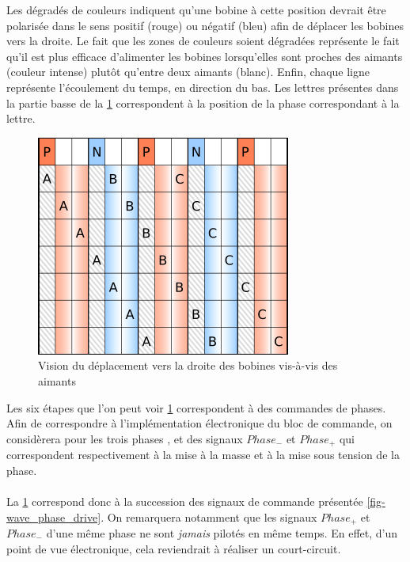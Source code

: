 Les dégradés de couleurs indiquent qu'une bobine à cette position devrait être polarisée dans le sens positif (rouge) ou négatif (bleu) afin de déplacer les bobines vers la droite.
Le fait que les zones de couleurs soient dégradées représente le fait qu'il est plus efficace d'alimenter les bobines lorsqu'elles sont proches des aimants (couleur intense) plutôt qu'entre deux aimants (blanc).
Enfin, chaque ligne représente l'écoulement du temps, en direction du bas.
Les lettres présentes dans la partie basse de la \cref{fig-bobines_vs_aimants} correspondent à la position de la phase correspondant à la lettre.
\begin{figure}[h]
    \centering
    \includegraphics{png/phases_aimants_switching.png}
    \caption{Vision du déplacement vers la droite des bobines vis-à-vis des aimants}
    \label{fig-bobines_vs_aimants}
\end{figure}

Les six étapes que l'on peut voir \cref{fig-bobines_vs_aimants} correspondent à des commandes de phases.
Afin de correspondre à l'implémentation électronique du bloc de commande, on considèrera pour les trois phases \pha, \phb et \phc des signaux $\mathit{Phase}_-$ et $\mathit{Phase}_+$
qui correspondent respectivement à la mise à la masse et à la mise sous tension de la phase.

\paragraph{}
La \cref{fig-bobines_vs_aimants} correspond donc à la succession des signaux de commande présentée \cref{fig-wave_phase_drive}. 
On remarquera notamment que les signaux $\mathit{Phase}_+$ et $\mathit{Phase}_-$ d'une même phase ne sont \emph{jamais} pilotés en même temps.
En effet, d'un point de vue électronique, cela reviendrait à réaliser un court-circuit. 

